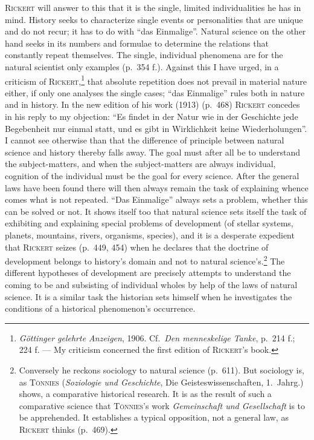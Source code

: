 \documentclass[12pt]{book}
\newcommand{\opage}[1]{\marginnote{\footnotesize\textit{[#1]}}}
\begin{document}
\textsc{Rickert} will answer to this that it is the single, limited individualities he has in
mind. History seeks to characterize single events or personalities that are unique and do not
recur; it has to do with ``das Einmalige''. Natural science on the other hand seeks in its
numbers and formulae to determine the relations that constantly repeat themselves. The single,
individual phenomena are for the natural scientist only examples (p.\ 354 f.). Against this I
have urged, in a criticism of \textsc{Rickert},\footnote{\textit{Göttinger gelehrte Anzeigen},
1906. Cf.\ \textit{Den menneskelige Tanke}, p.\ 214 f.; 224 f. --- My criticism concerned the
first edition of \textsc{Rickert}'s book.} that absolute repetition does not prevail in
material nature either, if only one analyses the single cases; ``das Einmalige'' rules both in
nature and in history. In the new edition of his work (1913) (p.\ 468) \textsc{Rickert}
concedes in his reply to my objection: ``Es findet in der Natur wie in der Geschichte jede
Begebenheit nur einmal statt, und es gibt in Wirklichkeit keine Wiederholungen''. I cannot see
otherwise than that the difference of principle between natural science and history thereby
falls away. The goal must after all be to understand the subject-matters, and when the
subject-matters are always individual, cognition of the individual must be the goal for every
science. After the general laws have been found there will then always remain the task of
explaining whence comes what is not repeated. ``Das Einmalige'' always sets a problem, whether
this can be solved or not. It shows itself too that natural science sets itself the task of
exhibiting and explaining special problems of development (of stellar systems, planets,
mountains, rivers, organisms, species), and it is a desperate expedient that \textsc{Rickert}
seizes (p.\ 449, 454) when he declares that the doctrine of development belongs to history's
domain and not to \opage{66}natural science's.\footnote{Conversely he reckons sociology to natural
science (p.\ 611). But sociology is, as \textsc{Tönnies} (\textit{Soziologie und Geschichte},
Die Geisteswissenschaften, 1.\ Jahrg.) shows, a comparative historical research. It is as the
result of such a comparative science that \textsc{Tönnies}'s work \textit{Gemeinschaft und
Gesellschaft} is to be apprehended. It establishes a typical opposition, not a general law, as
\textsc{Rickert} thinks (p.\ 469).} The different hypotheses of development are precisely
attempts to understand the coming to be and subsisting of individual wholes by help of the
laws of natural science. It is a similar task the historian sets himself when he investigates
the conditions of a historical phenomenon's occurrence.
\end{document}

